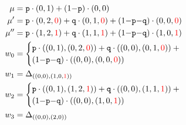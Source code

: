   {\scriptsize
  \begin{align*}
    \mu   &= \texttt{p}\cdot(0,1)+(1{-}\texttt{p})\cdot(0,0)\\
    \mu'  &= \texttt{p}\cdot(0,2,\textcolor{red}{0})+\texttt{q}\cdot(0,1,\textcolor{red}{0})+(1{-}\texttt{p}{-}\texttt{q})\cdot(0,0,\textcolor{red}{0})\\
    \mu'' &= \texttt{p}\cdot(1,2,\textcolor{red}{1})+\texttt{q}\cdot(1,1,\textcolor{red}{1})+(1{-}\texttt{p}{-}\texttt{q})\cdot(1,0,\textcolor{red}{1})\\
    w_0   &= \begin{cases}\texttt{p}\cdot((0,1),(0,2,\textcolor{red}{0}))+\texttt{q}\cdot((0,0),(0,1,\textcolor{red}{0}))+{}\\(1{-}\texttt{p}{-}\texttt{q})\cdot((0,0),(0,0,\textcolor{red}{0}))\end{cases}\\
    w_1   &= \Delta_{((0,0),(1,0,\textcolor{red}{1}))}\\
    w_2   &= \begin{cases}\texttt{p}\cdot((0,1),(1,2,\textcolor{red}{1}))+\texttt{q}\cdot((0,0),(1,1,\textcolor{red}{1}))+{}\\(1{-}\texttt{p}{-}\texttt{q})\cdot((0,0),(1,0,\textcolor{red}{1}))\end{cases}\\
    w_3   &= \Delta_{((0,0),(2,0))}
  \end{align*}
  }%


